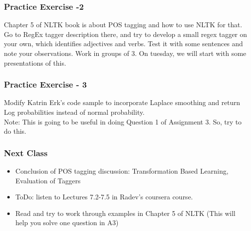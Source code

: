 \documentclass{beamer}
\begin{document}
\begin{frame}
\frametitle{Practice Exercise -2}
Chapter 5 of NLTK book is about POS tagging and how to use NLTK for that. Go to RegEx tagger description there, and try to develop a small regex tagger on your own, which identifies adjectives and verbs. Test it with some sentences and note your observations. Work in groups of 3. On tuesday, we will start with some presentations of this. 
\end{frame}

\begin{frame}
\frametitle{Practice Exercise - 3} 
Modify Katrin Erk's code sample to incorporate Laplace smoothing and return Log probabilities instead of normal probability.
\\Note: This is going to be useful in doing Question 1 of Assignment 3. So, try to do this.
\end{frame}

\begin{frame}
\frametitle{Next Class}
\begin{itemize}
\item Conclusion of POS tagging discussion: Transformation Based Learning, Evaluation of Taggers
\item ToDo: listen to Lectures 7.2-7.5 in Radev's coursera course.
\item Read and try to work through examples in Chapter 5 of NLTK (This will help you solve one question in A3)
\end{itemize}
\end{frame}
\end{document}
